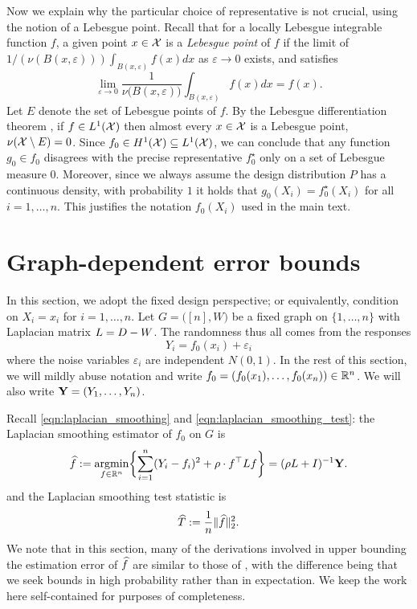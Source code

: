 Now we explain why the particular choice of representative is not crucial, using the notion of a Lebesgue point. Recall that for a locally Lebesgue integrable function $f$, a given point $x \in \mathcal{X}$ is a \emph{Lebesgue point} of $f$ if the limit of $1/(\nu(B(x,\varepsilon)))\int_{B(x,\varepsilon)} f(x) dx$ as $\varepsilon \to 0$ exists, and satisfies
\begin{equation*}
\lim_{\varepsilon \to 0} \frac{1}{\nu\bigl(B(x,\varepsilon)\bigr)} \int_{B(x,\varepsilon)} f(x) dx = f(x).
\end{equation*}
Let $E$ denote the set of Lebesgue points of $f$. By the Lebesgue differentiation theorem \citep{evans15}, if $f \in L^1(\mathcal{X})$ then almost every $x \in \mathcal{X}$ is a Lebesgue point, $\nu(\mathcal{X}\setminus E) = 0$. Since $f_0 \in H^1(\mathcal{X}) \subseteq L^1(\mathcal{X})$, we can conclude that any function $g_0 \in f_0$ disagrees with the precise representative $f_0^{\star}$ only on a set of Lebesgue measure 0. Moreover, since we always assume the design distribution $P$ has a continuous density, with probability $1$ it holds that $g_0(X_i) = f_0^{\star}(X_i)$ for all $i = 1,\ldots,n$. This justifies the notation $f_0(X_i)$ used in the main text.


\section{Graph-dependent error bounds}
\label{sec:fixed_graph_error_bounds}

In this section, we adopt the fixed design perspective; or equivalently, condition on $X_i = x_i$ for $i = 1,\ldots,n$. Let $G = \bigl([n],W\bigr)$ be a fixed graph on $\{1,\ldots,n\}$ with Laplacian matrix $L = D - W$. The randomness thus all comes from the responses 
\begin{equation}
\label{eqn:fixed_graph_regression_model}
Y_i = f_{0}(x_i) + \varepsilon_i
\end{equation}
where the noise variables $\varepsilon_i$ are independent $N(0,1)$. In the rest of this section, we will mildly abuse notation and write $f_0 = (f_0(x_1),\ldots,f_0(x_n)) \in \mathbb{R}^n$. We will also write ${\bf Y} = (Y_1,\ldots,Y_n)$.

Recall \eqref{eqn:laplacian_smoothing} and \eqref{eqn:laplacian_smoothing_test}: the Laplacian smoothing estimator of $f_0$ on $G$ is
\begin{equation*}
\label{eqn:ls_G}
\widehat{f} := \operatorname*{argmin}_{f \in \mathbb{R}^n} \biggl\{ \sum_{i = 1}^{n}(Y_i - f_i)^2 + \rho \cdot f^{\top} L f \biggr\} = (\rho L + I)^{-1}{\bf Y}.
\end{equation*}
and the Laplacian smoothing test statistic is 
\begin{equation*}
\label{eqn:ls_ts_G}
\widehat{T} := \frac{1}{n} \|\widehat{f}\|_2^2.
\end{equation*}
We note that in this section, many of the derivations involved in upper bounding the estimation error of $\widehat{f}$ are similar to those of \cite{sadhanala16}, with the difference being that we seek bounds in high probability rather than in expectation. We keep the work here self-contained for purposes of completeness.

